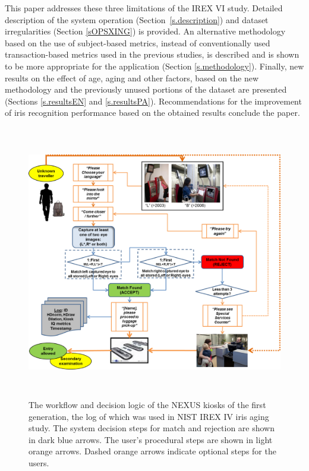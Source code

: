 \documentclass{cta-author}%
\begin{document}
This paper addresses these three limitations of the IREX VI study. 
Detailed description of the system operation (Section~\ref{s.description})
and dataset irregularities (Section \ref{sOPSXING}) is provided.
An alternative methodology based on the use of subject-based metrics, instead of conventionally used transaction-based metrics used in the previous studies,
is described and is shown to be more appropriate for the application 
(Section \ref{s.methodology}).
Finally, new results on the effect of age, aging and other factors, based on the new methodology and the previously unused portions of the dataset are presented (Sections \ref{s.resultsEN} and \ref{s.resultsPA}). 
Recommendations for the improvement of iris recognition performance based on the obtained results  conclude the paper. 



\begin{figure}[!t]
\centering
\includegraphics[width=14.5cm,height=12cm]{eps/nexus-workflow-new.eps} 
\caption{The workflow and decision logic of the NEXUS kiosks of the first generation, the log of which was used in NIST IREX IV iris aging study.  The system decision steps for match and rejection 
are shown in dark blue arrows.  The user's procedural steps are shown in light orange arrows. Dashed orange arrows indicate optional steps for the users. 
\label{f.workflow}}
\end{figure}
\end{document}
